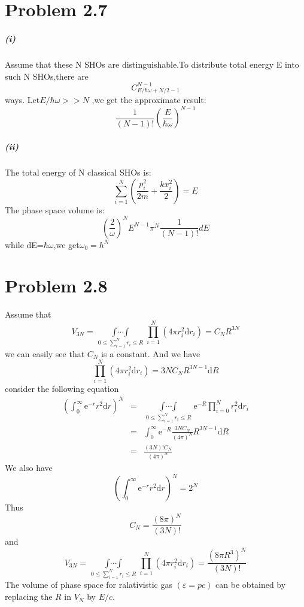 \documentclass{article}
\begin{document}
\section*{Problem 2.7}
\subparagraph{(i)}
Assume that these N SHOs are distinguishable.To distribute total energy E into such N SHOs,\quad there are 
$$C_{E/\hbar \omega+N/2-1}^{N-1}$$ways. \quad 
Let\quad $E/\hbar \omega >>N$ ,we get the approximate result: 
$$
\frac{1}{(N-1)!} (\frac{E}{\hbar \omega} )^{N-1}
$$
\subparagraph{(ii)}
The total energy of N classical SHOs is:
$$\sum_{i=1}^{N}(\frac{p_i^2}{2m}+\frac{k x_i ^2}{2})=E$$
The phase space volume is:
$$(\frac{2}{\omega})^N E^{N-1} \pi ^N \frac{1}{(N-1)!} dE$$
while dE=$\hbar \omega$,\quad we get\quad $\omega_0=h^N$
\section*{Problem 2.8}
Assume that
\begin{equation}
V_{3N}=\mathop{\int\cdots\int}\limits_{0\le\sum\limits_{i=1}^{N}r_i\le R}\prod_{i=1}^{N}(4\pi r_i^2\mathrm{d}r_i)=C_NR^{3N}
\end{equation}
we can easily see that $C_N$ is a constant. And we have
\begin{equation}
\prod_{i=1}^{N}(4\pi r_i^2\mathrm{d}r_i)=3NC_NR^{3N-1}\mathrm{d}R
\end{equation}
consider the following equation
\begin{eqnarray}
(\int_{0}^{\infty}\mathrm{e}^{-r}r^2\mathrm{d}r)^N&=&\mathop{\int\cdots\int}\limits_{0\le\sum\limits_{i=1}^{N}r_i\le R}\mathrm{e}^{-R}\prod_{i=0}^Nr_i^2\mathrm{d}r_i\\&=&\int_0^\infty\mathrm{e}^{-R}\frac{3NC_N}{(4\pi)^N}R^{3N-1}\mathrm{d}R\\&=&\frac{(3N)!C_N}{(4\pi)^N}
\end{eqnarray}
We also have
\begin{equation}
(\int_{0}^{\infty}\mathrm{e}^{-r}r^2\mathrm{d}r)^N=2^N
\end{equation}
Thus
\begin{equation}
C_N=\frac{(8\pi)^N}{(3N)!}
\end{equation}
and
\begin{equation}
V_{3N}=\mathop{\int\cdots\int}\limits_{0\le\sum\limits_{i=1}^{N}r_i\le R}\prod_{i=1}^{N}(4\pi r_i^2\mathrm{d}r_i)=\frac{(8\pi R^3)^N}{(3N)!}
\end{equation}
The volume of phase space for ralativistic gas $(\varepsilon=pc)$ can be obtained by replacing the $R$ in $V_N$ by $E/c$.
\end{document}
